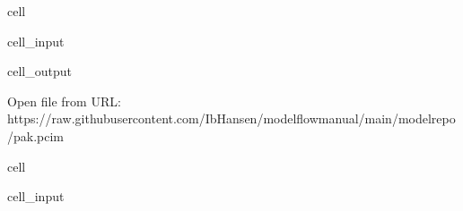 \documentclass[letterpaper,10pt,english]{jupyterBook}
\begin{document}
\begin{sphinxuseclass}{cell}\begin{sphinxVerbatimInput}

\begin{sphinxuseclass}{cell_input}
\begin{sphinxVerbatim}[commandchars=\\\{\}]
  
\end{sphinxVerbatim}

\end{sphinxuseclass}\end{sphinxVerbatimInput}
\begin{sphinxVerbatimOutput}

\begin{sphinxuseclass}{cell_output}
\begin{sphinxVerbatim}[commandchars=\\\{\}]
Open file from URL:  https://raw.githubusercontent.com/IbHansen/modelflow\PYGZhy{}manual/main/model\PYGZus{}repo/pak.pcim
\end{sphinxVerbatim}

\end{sphinxuseclass}\end{sphinxVerbatimOutput}

\end{sphinxuseclass}
\begin{sphinxuseclass}{cell}\begin{sphinxVerbatimInput}

\begin{sphinxuseclass}{cell_input}
\begin{sphinxVerbatim}[commandchars=\\\{\}]
        
\end{sphinxVerbatim}

\end{sphinxuseclass}\end{sphinxVerbatimInput}

\end{sphinxuseclass}
\end{document}
